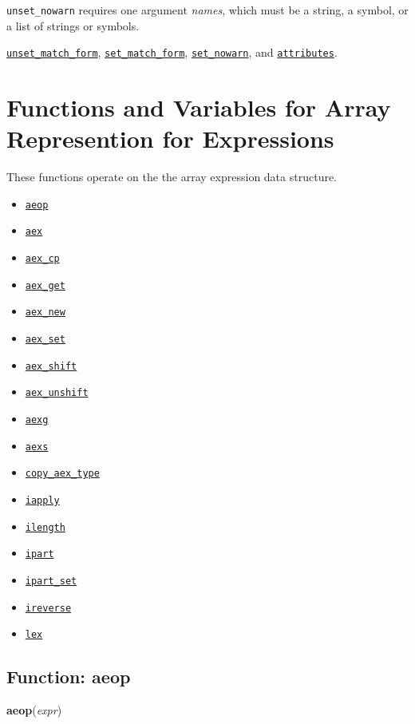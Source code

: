 \documentclass[]{article}
\begin{document}
\vspace{5 pt}

   {\tt unset\_nowarn} requires one argument {\it names}, which must be  a string, a symbol, or a list of strings or symbols.


\vspace{5 pt}


  \hyperlink{unset_match_form}{{\tt unset\_match\_form}}, \hyperlink{set_match_form}{{\tt set\_match\_form}}, \hyperlink{set_nowarn}{{\tt set\_nowarn}}, and \hyperlink{attributes}{{\tt attributes}}.

\vspace{5 pt}


\section{Functions and Variables for Array Represention for Expressions}

 These functions operate on the the array expression data structure.
\begin{itemize}
\item \hyperlink{aeop}{{\tt aeop}}
\item \hyperlink{aex}{{\tt aex}}
\item \hyperlink{aex_cp}{{\tt aex\_cp}}
\item \hyperlink{aex_get}{{\tt aex\_get}}
\item \hyperlink{aex_new}{{\tt aex\_new}}
\item \hyperlink{aex_set}{{\tt aex\_set}}
\item \hyperlink{aex_shift}{{\tt aex\_shift}}
\item \hyperlink{aex_unshift}{{\tt aex\_unshift}}
\item \hyperlink{aexg}{{\tt aexg}}
\item \hyperlink{aexs}{{\tt aexs}}
\item \hyperlink{copy_aex_type}{{\tt copy\_aex\_type}}
\item \hyperlink{iapply}{{\tt iapply}}
\item \hyperlink{ilength}{{\tt ilength}}
\item \hyperlink{ipart}{{\tt ipart}}
\item \hyperlink{ipart_set}{{\tt ipart\_set}}
\item \hyperlink{ireverse}{{\tt ireverse}}
\item \hyperlink{lex}{{\tt lex}}
\end{itemize}
\subsection{Function: aeop\label{sec:aeop}}
\hypertarget{aeop}{}
{\bf aeop}({\it expr})
\end{document}
